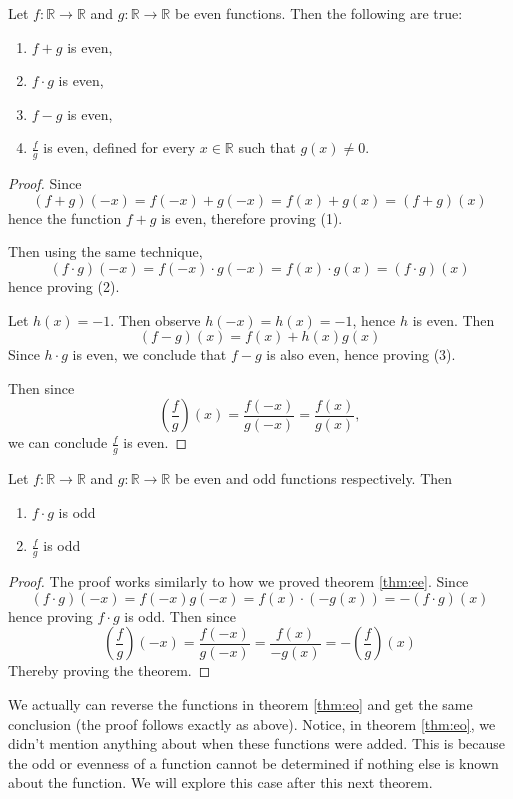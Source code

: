 \documentclass[11pt]{article}
\numberwithin{lemma}{section}
\numberwithin{equation}{section}
\numberwithin{define}{section}
\numberwithin{prop}{section}
\numberwithin{figure}{section}
\numberwithin{theorem}{section}
\newcounter{ex}[section]
\numberwithin{ex}{section}
\def\real{\mathbb{R}}
\def\paren#1{\left(#1\right)}
\begin{document}
\begin{theorem}
\label{thm:ee}
	Let $f:\real\to\real$ and $g:\real\to\real$ be even functions. Then the following are true:
	\begin{enumerate}
		\item $f+g$ is even,
		\item $f\cdot g$ is even,
		\item $f-g$ is even,
		\item $\frac{f}{g}$ is even, defined for every $x\in \real$ such that $g(x)\neq0$. 
	\end{enumerate}
\end{theorem}
\begin{proof}
	Since
	$$(f+g)(-x)=f(-x)+g(-x)=f(x)+g(x)=(f+g)(x)$$
	hence the function $f+g$ is even, therefore proving (1).
	
	Then using the same technique,
	$$(f\cdot g)(-x)=f(-x)\cdot g(-x)=f(x)\cdot g(x)=(f\cdot g)(x)$$
	hence proving (2).
	
	Let $h(x)=-1$. Then observe $h(-x)=h(x)=-1$, hence $h$ is even. Then
	$$(f-g)(x)=f(x)+h(x)g(x)$$
	Since $h\cdot g$ is even, we conclude that $f-g$ is also even, hence proving (3).
	
	Then since
	$$\paren{\frac{f}{g}}(x)=\frac{f(-x)}{g(-x)}=\frac{f(x)}{g(x)},$$
	we can conclude $\frac{f}{g}$ is even.
\end{proof}

\begin{theorem}
\label{thm:eo}
Let $f:\real\to\real$ and $g:\real\to\real$ be even and odd functions respectively. Then
\begin{enumerate}
	\item $f\cdot g$ is odd
	\item $\frac{f}{g}$ is odd
\end{enumerate}
\end{theorem}
\begin{proof}
	The proof works similarly to how we proved theorem \eqref{thm:ee}.
	Since
	$$(f\cdot g)(-x)=f(-x)g(-x)=f(x)\cdot (-g(x))=-(f\cdot g)(x)$$
	hence proving $f\cdot g$ is odd.
	Then since
	$$\paren{\frac{f}{g}}(-x)=\frac{f(-x)}{g(-x)}=\frac{f(x)}{-g(x)}=-\paren{\frac{f}{g}}(x)$$
	Thereby proving the theorem.
\end{proof}
 We actually can reverse the functions in theorem \eqref{thm:eo} and get the same conclusion (the proof follows exactly as above). Notice, in theorem \eqref{thm:eo}, we didn't mention anything about when these functions were added. This is because the odd or evenness of a function cannot be determined if nothing else is known about the function. We will explore this case after this next theorem.
 
\end{document}
